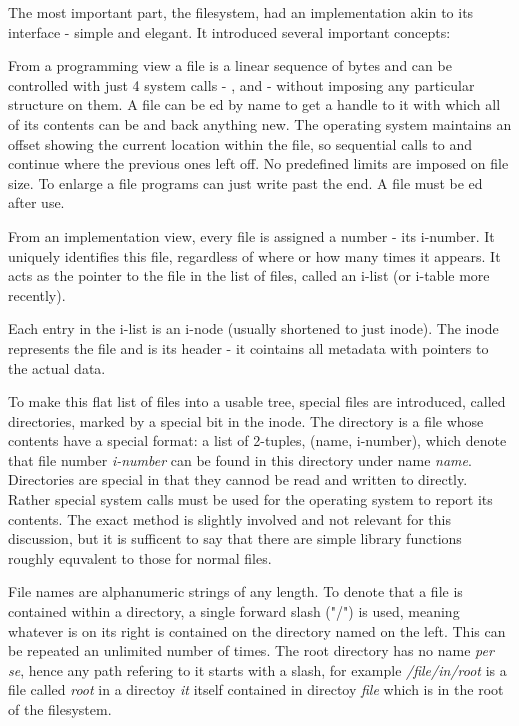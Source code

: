         The most important part, the filesystem, had an implementation akin to
        its interface - simple and elegant. It introduced several important
        concepts:

        From a programming view a file is a linear sequence of bytes and can be
        controlled with just 4 system calls -  ,
         and  - without imposing any particular
        structure on them. A file can be ed by name to get a
        handle to it with which all of its contents can be  and
         back anything new. The operating system maintains an
        offset showing the current location within the file, so sequential
        calls to  and  continue where the previous
        ones left off. No predefined limits are imposed on file size. To
        enlarge a file programs can just write past the end. A file must be
        ed after use.

        From an implementation view, every file is assigned a number - its
        i-number. It uniquely identifies this file, regardless of where or how
        many times it appears. It acts as the pointer to the file in the list
        of files, called an i-list (or i-table more recently).

        Each entry in the i-list is an i-node (usually shortened to just
        inode). The inode represents the file and is its header - it cointains
        all metadata with pointers to the actual data.

        To make this flat list of files into a usable tree, special files are
        introduced, called directories, marked by a special bit in the inode.
        The directory is a file whose contents have a special format: a list of
        2-tuples, (name, i-number), which denote that file number
        \textit{i-number} can be found in this directory under name
        \textit{name}. Directories are special in that they cannod be read and
        written to directly. Rather special system calls must be used for the
        operating system to report its contents. The exact method is slightly
        involved and not relevant for this discussion, but it is sufficent to
        say that there are simple library functions roughly equvalent to those
        for normal files.

        File names are alphanumeric strings of any length. To denote that a
        file is contained within a directory, a single forward slash ("/") is
        used, meaning whatever is on its right is contained on the directory
        named on the left. This can be repeated an unlimited number of times.
        The root directory has no name \textit{per se}, hence any path refering
        to it starts with a slash, for example \textit{/file/in/root} is a file
        called \textit{root} in a directoy \textit{it} itself contained in
        directoy \textit{file} which is in the root of the filesystem.

